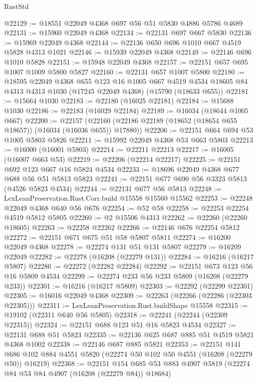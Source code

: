 \begin{lexlean}{RustStd}
\begin{coremodule}
@22129 := @18551 @22049 @4368 @697 @56 @51 @5830 @4886 @5786 @4689
@22131 := @15960 @22049 @4368
@22134 := @22131 @697 @667 @5830
@22136 := @15969 @22049 @4368
@22144 := @22136 @650 @696 @1010 @667 @4519 @5828 @4313 @1021
@22146 := @15939 @22049 @4368
@22149 := @22146 @696 @1010 @5828
@22151 := @15948 @22049 @4368
@22157 := @22151 @657 @695 @1007 @1009 @5800 @5827
@22160 := @22131 @657 @1007 @5800
@22180 := @18595
    @22049
    @4368
    @655
    @123
    @16
    @1005
    @667
    @4519
    @4534
    @18605
    @84
    @4313
    @4313
    @1030
    (@17245 @22049 @4368)
    (@15790 (@18633 @655))
@22181 := @15664 @1030
@22183 := @22180 (@16025 @22181)
@22184 := @15688 @1030
@22186 := @22183 (@16029 @22184)
@22189 := @16034 (@18644 @1005 @667)
@22200 := @22157
    (@22160 (@22186 @22189 (@18652 (@18654 @655 @18657)) (@16034 (@16036 @655)) @17880))
@22206 := @22151 @664 @694 @53 @1005 @5803 @5826
@22211 := @15992 @22049 @4368 @53 @663 @5803
@22213 := @16000 (@16001 @5803)
@22214 := @22211 @22213
@22217 := @16005 (@16007 @663 @53)
@22219 := @22206 (@22214 @22217)
@22225 := @22151 @692 @123 @667 @16 @5824 @4534
@22233 := @18696 @22049 @4368 @677 @688 @56 @51 @5813 @5823
@22241 := @22151 @677 @690 @56 @3323 @5813 (@4526 @5823 @4534)
@22244 := @22131 @677 @56 @5813
@22248 := LexLeanPreservation.Rust.Corr.build @15558 @15560 @15562
@22253 := @22248 @22049 @4368 @640 @56 @676
@22254 := @52 @58
@22258 := @22253 @22254 @4519 @5812 @5805
@22260 := @2 @15506 @4313
@22262 := @22260 (@22260 @18605)
@22263 := @22258 @22262
@22266 := @22146 @676 @22254 @5812
@22272 := @22151 @671 @675 @51 @58 @5807 @5811
@22274 := @16200 @22049 @4368
@22278 := @22274 @131 @51 @131 @5807
@22279 := @16209 @22049
@22282 := @22278 (@16208 (@22279 @131))
@22284 := @16216 (@16217 @5807)
@22286 := @22272 (@22282 @22284)
@22292 := @22151 @673 @123 @56 @16 @5809 @4534
@22299 := @22274 @233 @56 @233 @5809 (@16208 (@22279 @233))
@22301 := @16216 (@16217 @5809)
@22303 := @22292 (@22299 @22301)
@22305 := @16016 @22049 @4368
@22309 := @22263 (@22266 (@22286 (@22303 @22305)))
@22311 := LexLeanPreservation.Rust.buildShape @15558
@22315 := @19102 (@22311 @640 @56 @5805)
@22318 := @22241 (@22244 (@22309 @22315))
@22324 := @22151 @688 @123 @51 @16 @5823 @4534
@22327 := @22131 @688 @51 @5823
@22335 := @22136 @625 @687 @885 @51 @4519 @5821 @4368 @1002
@22338 := @22146 @687 @885 @5821
@22353 := @22151
    @141
    @686
    @102
    @884
    @4551
    @5820
    (@22274 @50 @102 @50 @4551 (@16208 (@22279 @50)) @16219)
@22368 := @22151
    @154
    @685
    @53
    @883
    @4907
    @5819
    (@22274 @84 @53 @84 @4907 (@16208 (@22279 @84)) @18684)

\end{coremodule}
\end{lexlean}
